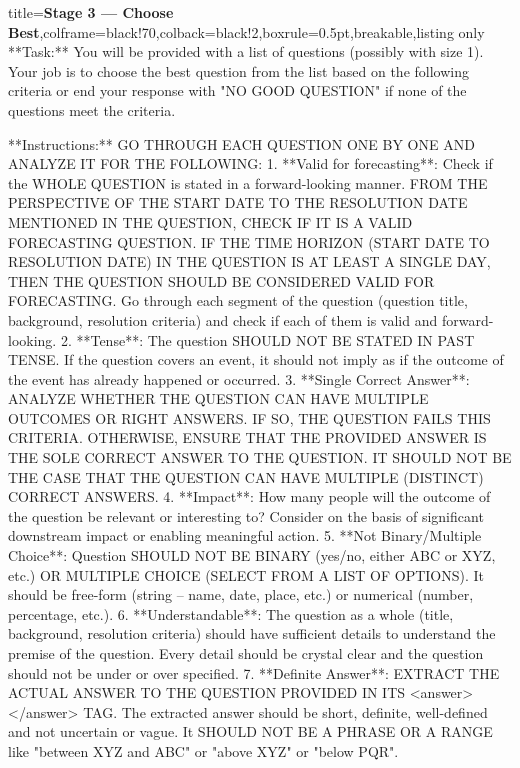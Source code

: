 \begin{tcblisting}{title={\textbf{Stage 3 --- Choose Best}},colframe=black!70,colback=black!2,boxrule=0.5pt,breakable,listing only}
**Task:** You will be provided with a list of questions (possibly with size 1). Your job is to choose the best question from the list based on the following criteria or end your response with "NO GOOD QUESTION" if none of the questions meet the criteria.

**Instructions:**
GO THROUGH EACH QUESTION ONE BY ONE AND ANALYZE IT FOR THE FOLLOWING:
1. **Valid for forecasting**: Check if the WHOLE QUESTION is stated in a forward-looking manner. FROM THE PERSPECTIVE OF THE START DATE TO THE RESOLUTION DATE MENTIONED IN THE QUESTION, CHECK IF IT IS A VALID FORECASTING QUESTION. IF THE TIME HORIZON (START DATE TO RESOLUTION DATE) IN THE QUESTION IS AT LEAST A SINGLE DAY, THEN THE QUESTION SHOULD BE CONSIDERED VALID FOR FORECASTING. Go through each segment of the question (question title, background, resolution criteria) and check if each of them is valid and forward-looking.
2. **Tense**: The question SHOULD NOT BE STATED IN PAST TENSE. If the question covers an event, it should not imply as if the outcome of the event has already happened or occurred.
3. **Single Correct Answer**: ANALYZE WHETHER THE QUESTION CAN HAVE MULTIPLE OUTCOMES OR RIGHT ANSWERS. IF SO, THE QUESTION FAILS THIS CRITERIA. OTHERWISE, ENSURE THAT THE PROVIDED ANSWER IS THE SOLE CORRECT ANSWER TO THE QUESTION. IT SHOULD NOT BE THE CASE THAT THE QUESTION CAN HAVE MULTIPLE (DISTINCT) CORRECT ANSWERS.
4. **Impact**: How many people will the outcome of the question be relevant or interesting to? Consider on the basis of significant downstream impact or enabling meaningful action.
5. **Not Binary/Multiple Choice**: Question SHOULD NOT BE BINARY (yes/no, either ABC or XYZ, etc.) OR MULTIPLE CHOICE (SELECT FROM A LIST OF OPTIONS). It should be free-form (string -- name, date, place, etc.) or numerical (number, percentage, etc.). 
6. **Understandable**: The question as a whole (title, background, resolution criteria) should have sufficient details to understand the premise of the question. Every detail should be crystal clear and the question should not be under or over specified. 
7. **Definite Answer**: EXTRACT THE ACTUAL ANSWER TO THE QUESTION PROVIDED IN ITS <answer> </answer> TAG. The extracted answer should be short, definite, well-defined and not uncertain or vague. It SHOULD NOT BE A PHRASE OR A RANGE like "between XYZ and ABC" or "above XYZ" or "below PQR". 




\end{tcblisting}
